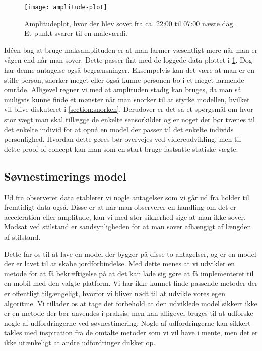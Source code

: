 \begin{figure}[h]
	\centering
	\texttt{[image: amplitude-plot]}
	\caption{Amplitudeplot, hvor der blev sovet fra ca. 22:00 til 07:00 næste dag. Et punkt svarer til en måleværdi.}\label{fig:amplplot}
\end{figure}

Idéen bag at bruge maksamplituden er at man larmer væsentligt mere når man er vågen end når man sover.
Dette passer fint med de loggede data plottet i \cref{fig:amplplot}.
Dog har denne antagelse også begrænsninger.
Eksempelvis kan det være at man er en stille person, snorker meget eller også kunne personen bo i et meget larmende område.
Alligevel regner vi med at amplituden stadig kan bruges, da man så muligvis kunne finde et mønster når man snorker til at styrke modellen, hvilket vil blive diskuteret i \cref{section:snorken}.
Derudover er det så et spørgsmål om hvor stor vægt man skal tillægge de enkelte sensorkilder og er noget der bør trænes til det enkelte individ for at opnå en model der passer til det enkelte individs personlighed.
Hvordan dette gøres bør overvejes ved videreudvikling, men til dette proof of concept kan man som en start bruge fastsatte statiske vægte.

\subsection{Søvnestimerings model}
Ud fra observeret data etablerer vi nogle antagelser som vi går ud fra holder til fremtidigt data også.
Disse er at når man observerer en handling om det er acceleration eller amplitude, kan vi med stor sikkerhed sige at man ikke sover.
Modsat ved stilstand er sandsynligheden for at man sover afhængigt af længden af stilstand.

Dette får os til at lave en model der bygger på disse to antagelser, og er en model der er lavet til at skabe jordforbindelse.
Med dette menes at vi udvikler en metode for at få bekræftigelse på at det kan lade sig gøre at få implementeret til en mobil med den valgte platform.
Vi har ikke kunnet finde passende metoder der er offentligt tilgængeligt, hvorfor vi bliver nødt til at udvikle vores egen algoritme.
Vi tillader os at tage det forbehold at den udviklede model sikkert ikke er en metode der bør anvendes i praksis, men kan alligevel bruges til at udforske nogle af udfordringerne ved søvnestimering.
Nogle af udfordringerne kan sikkert takles med inspiration fra de omtalte metoder som vi vil have i mente, men det er ikke utænkeligt at andre udfordringer dukker op.

